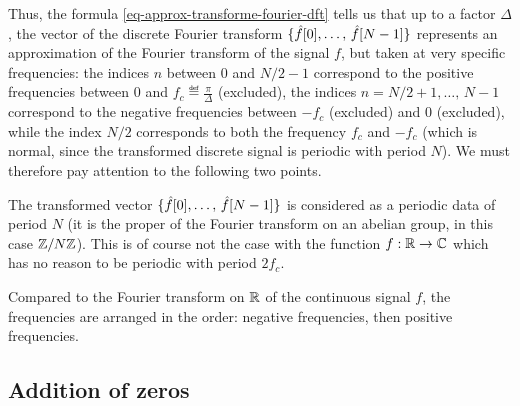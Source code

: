  
Thus, the formula \eqref{eq-approx-transforme-fourier-dft} tells us that up to a factor $ \Delta $, the vector of the discrete Fourier transform $ \{\hat{f}[0], \ldots, \, \hat{f}[N-1] \} $ represents an approximation of the Fourier transform of the signal $ f $, but taken at very specific frequencies: the indices $ n $ between $ 0 $ and $ N / 2-1 $ correspond to the positive frequencies between $ 0 $ and $ f_c \eqdef \frac{\pi}{\Delta} $ (excluded), the indices $ n = N / 2 + 1, \ldots, \, N -1 $ correspond to the negative frequencies between $ -f_c $ (excluded) and $ 0 $ (excluded), while the index $ N / 2 $ corresponds to both the frequency $ f_c $ and $ -f_c $ (which is normal, since the transformed discrete signal is periodic with period $ N $). We must therefore pay attention to the following two points. \begin{rs}
\item The transformed vector $ \{\hat{f}[0], \ldots, \, \hat{f}[N-1] \} $ is considered as a periodic data of period $ N $ (it is the proper of the Fourier transform on an abelian group, in this case $ \mathbb{Z}/N \mathbb{Z} $). This is of course not the case with the function $ f: \mathbb{R} \rightarrow \mathbb{C} $ which has no reason to be periodic with period $ 2 f_c $.
\item Compared to the Fourier transform on $ \mathbb{R} $ of the continuous signal $ f $, the frequencies are arranged in the order: negative frequencies, then positive frequencies.
\end{rs}
\subsection{Addition of zeros}
\label{sect2-addition-zeros} 
 
